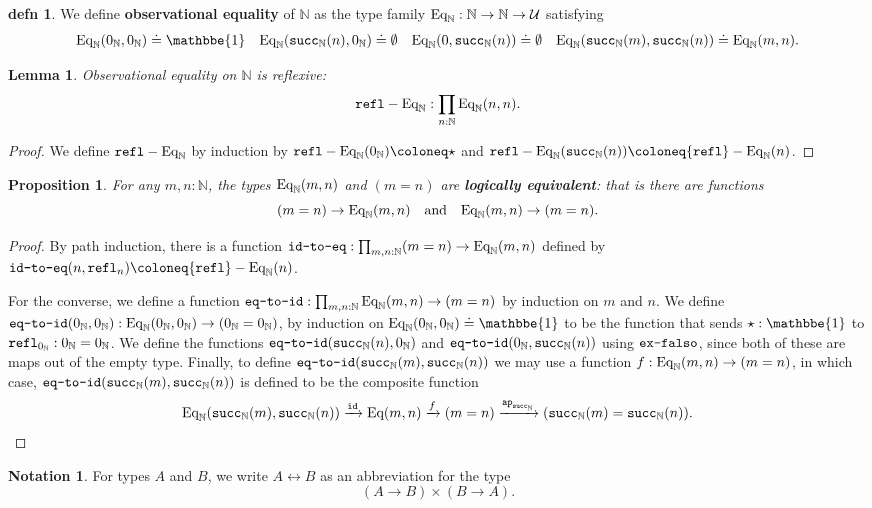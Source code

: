 \documentclass{amsart}
\theoremstyle{theorem}
\newtheorem*{lem}{Lemma}
\newtheorem*{prop}{Proposition}
\theoremstyle{definition}
\newtheorem*{defn}{defn}
\newtheorem*{ntn}{Notation}
\theoremstyle{remark}
\newcommand{\0}{\mathbbe{0}}
\newcommand{\1}{\mathbbe{1}}
\newcommand{\2}{\mathbbe{2}}
\newcommand{\3}{\mathbbe{3}}
\newcommand{\4}{\mathbbe{4}}
\newcommand{\term}[1]{{\textup{\texttt{#1}}}}
\newcommand{\id}{\term{id}}
\newcommand{\bN}{{\mathbb{N}}}
\newcommand{\suc}{\term{succ}_{\bN}}
\newcommand{\refl}{\term{refl}}
\newcommand{\ap}{\term{ap}}
\newcommand{\UU}{{\mathcal{U}}}
\newcommand{\Eq}{\textup{\text{Eq}}}
\begin{document}
\begin{defn} We define \textbf{observational equality} of $\bN$ as the type family $\Eq_\bN : \bN \to \bN \to \UU$ satisfying
\[ \Eq_\bN(0_\bN,0_\bN) \doteq \1 \quad \Eq_\bN(\suc(n),0_\bN) \doteq \emptyset \quad \Eq_\bN(0,\suc(n)) \doteq \emptyset \quad \Eq_\bN(\suc(m), \suc(n)) \doteq \Eq_\bN(m,n).\]
\end{defn}

\begin{lem} Observational equality on $\bN$ is reflexive:
\[ \refl-\Eq_\bN : \prod_{n : \bN} \Eq_\bN(n,n).\]
\end{lem}
\begin{proof}
We define $\refl-\Eq_\bN$ by induction by $\refl-\Eq_\bN(0_\bN) \coloneq \star$ and $\refl-\Eq_\bN(\suc(n)) \coloneq \refl-\Eq_\bN(n)$.
\end{proof}

\begin{prop} For any $m,n : \bN$, the types $\Eq_\bN(m,n)$ and $(m=n)$ are \textbf{logically equivalent}: that is there are functions
\[ (m = n) \to \Eq_\bN(m,n) \quad \text{and} \quad \Eq_\bN(m,n) \to (m=n).\]
\end{prop}
\begin{proof}
By path induction, there is a function $\term{id-to-eq} : \prod_{m,n: \bN} (m =n) \to \Eq_\bN(m,n)$ defined by $\term{id-to-eq}(n,\refl_n) \coloneq \refl-\Eq_\bN(n)$. 

For the converse, we define a function $\term{eq-to-id} : \prod_{m,n : \bN} \Eq_\bN(m,n) \to (m=n)$ by induction on $m$ and $n$. We define $\term{eq-to-id}(0_\bN,0_\bN) : \Eq_\bN(0_\bN,0_\bN) \to (0_\bN = 0_\bN)$, by induction on $\Eq_\bN(0_\bN,0_\bN) \doteq \1$ to be the function that sends $\star : \1$ to $\refl_{0_\bN} : 0_\bN = 0_\bN$. We define the functions $\term{eq-to-id}(\suc(n),0_\bN)$ and $\term{eq-to-id}(0_\bN,\suc(n))$ using $\term{ex-falso}$, since both of these are maps out of the empty type. Finally, to define $\term{eq-to-id}(\suc(m),\suc(n))$ we may use a function $f : \Eq_\bN(m,n) \to (m=n)$, in which case, $\term{eq-to-id}(\suc(m),\suc(n))$  is defined to be the composite function
\[ \Eq_\bN(\suc(m),\suc(n)) \xrightarrow{\id} \Eq(m,n) \xrightarrow{f} (m=n) \xrightarrow{\ap_{\suc}} (\suc(m)=\suc(n)).\]
\end{proof}

\begin{ntn} For types $A$ and $B$, we write $A \leftrightarrow B$ as an abbreviation for the type
\[ (A \to B) \times (B \to A).\]
\end{ntn}
\end{document}
